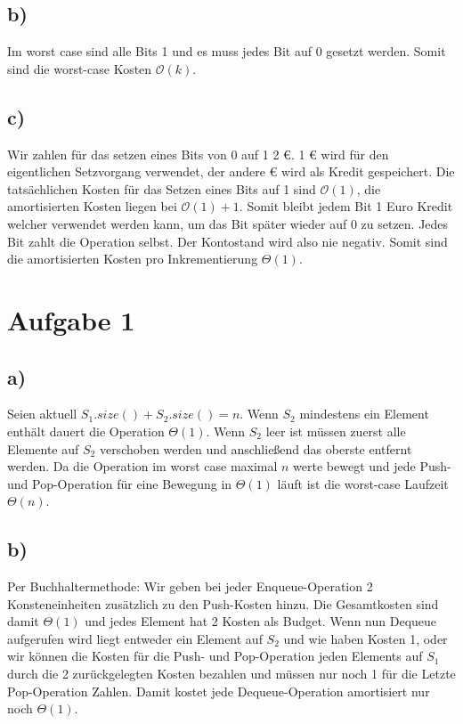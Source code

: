 \documentclass[a4paper]{scrartcl}
\def\Oh{\ensuremath{\mathcal{O}}} %
\begin{document}
\subsection*{b)}
Im worst case sind alle Bits 1 und es muss jedes Bit auf 0 gesetzt werden. Somit sind die worst-case Kosten $\Oh(k)$.

\subsection*{c)}
Wir zahlen für das setzen eines Bits von 0 auf 1 2 €. 1 € wird für den eigentlichen Setzvorgang verwendet, der andere € wird als Kredit gespeichert. Die tatsächlichen Kosten für das Setzen eines Bits auf 1 sind $\Oh(1)$, die amortisierten Kosten liegen bei $\Oh(1)+1$. 
    Somit bleibt jedem Bit 1 Euro Kredit welcher verwendet werden kann, um das Bit später wieder auf 0 zu setzen. Jedes Bit zahlt die Operation selbst. Der Kontostand wird also nie negativ. Somit sind die amortisierten Kosten pro Inkrementierung $\Theta(1)$.

\section*{Aufgabe 1}
\subsection*{a)}
Seien aktuell \texttt{$S_1.size()+S_2.size()=n$}. Wenn $S_2$ mindestens ein Element enthält dauert die Operation $\Theta(1)$. Wenn $S_2$ leer ist müssen zuerst alle Elemente auf $S_2$ verschoben werden und anschließend das oberste entfernt werden. Da die Operation im worst case maximal $n$ werte bewegt und jede Push- und Pop-Operation für eine Bewegung in $\Theta(1)$ läuft ist die worst-case Laufzeit $\Theta(n)$.

\subsection*{b)}
Per Buchhaltermethode: Wir geben bei jeder Enqueue-Operation 2 Konsteneinheiten zusätzlich zu den Push-Kosten hinzu. Die Gesamtkosten sind damit $\Theta(1)$ und jedes Element hat 2 Kosten als Budget. Wenn nun Dequeue aufgerufen wird liegt entweder ein Element auf $S_2$ und wie haben Kosten 1, oder wir können die Kosten für die Push- und Pop-Operation jeden Elements auf $S_1$ durch die 2 zurückgelegten Kosten bezahlen und müssen nur noch 1 für die Letzte Pop-Operation Zahlen. Damit kostet jede Dequeue-Operation amortisiert nur noch $\Theta(1)$.
\end{document}
